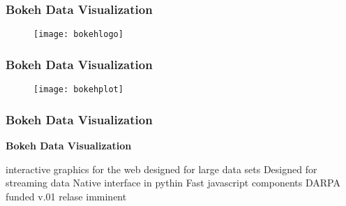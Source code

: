  \frametitle{Bokeh Data Visualization}
  \begin{figure}
\centering
\texttt{[image: bokehlogo]}
\end{figure}

 
 
 \frametitle{Bokeh Data Visualization}

\begin{figure}
\centering
\texttt{[image: bokehplot]}

\end{figure}
 
 
 
 \frametitle{Bokeh Data Visualization}
 \textbf{Bokeh Data Visualization}
  
   interactive graphics for the web
   designed for large data sets
   Designed for streaming data
   Native interface in pythin
   Fast javascript components
   DARPA funded
   v.01 relase imminent
  
 
 
